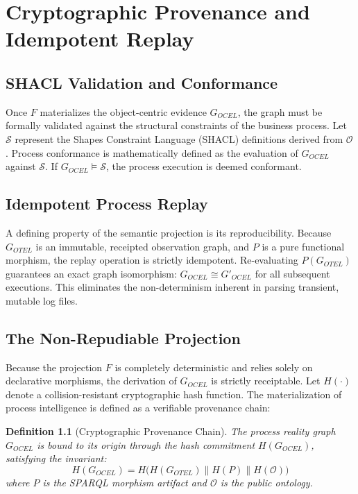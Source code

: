 \documentclass[12pt,a4paper,oneside]{book}
\newtheorem{definition}{Definition}[chapter]
\begin{document}
\chapter{Cryptographic Provenance and Idempotent Replay}

\section{SHACL Validation and Conformance}
Once $F$ materializes the object-centric evidence $G_{OCEL}$, the graph must be formally validated against the structural constraints of the business process. Let $\mathcal{S}$ represent the Shapes Constraint Language (SHACL) definitions derived from $\mathcal{O}$. Process conformance is mathematically defined as the evaluation of $G_{OCEL}$ against $\mathcal{S}$. If $G_{OCEL} \models \mathcal{S}$, the process execution is deemed conformant.

\section{Idempotent Process Replay}
A defining property of the semantic projection is its reproducibility. Because $G_{OTEL}$ is an immutable, receipted observation graph, and $P$ is a pure functional morphism, the replay operation is strictly idempotent. Re-evaluating $P(G_{OTEL})$ guarantees an exact graph isomorphism: $G_{OCEL} \cong G'_{OCEL}$ for all subsequent executions. This eliminates the non-determinism inherent in parsing transient, mutable log files.

\section{The Non-Repudiable Projection}
Because the projection $F$ is completely deterministic and relies solely on declarative morphisms, the derivation of $G_{OCEL}$ is strictly receiptable. Let $H(\cdot)$ denote a collision-resistant cryptographic hash function. The materialization of process intelligence is defined as a verifiable provenance chain:

\begin{definition}[Cryptographic Provenance Chain]
The process reality graph $G_{OCEL}$ is bound to its origin through the hash commitment $H(G_{OCEL})$, satisfying the invariant:
$$ H(G_{OCEL}) = H \Big( H(G_{OTEL}) \parallel H(P) \parallel H(\mathcal{O}) \Big) $$
where $P$ is the SPARQL morphism artifact and $\mathcal{O}$ is the public ontology.
\end{definition}
\end{document}
